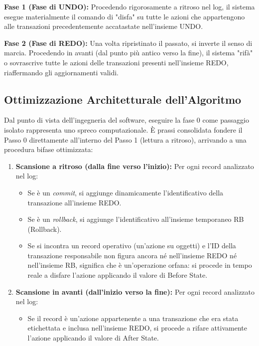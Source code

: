 \textbf{Fase 1 (Fase di UNDO):}
Procedendo rigorosamente a ritroso nel log, il sistema esegue materialmente il comando di "disfa" su tutte le azioni che appartengono alle transazioni precedentemente accatastate nell'insieme UNDO.

\textbf{Fase 2 (Fase di REDO):}
Una volta ripristinato il passato, si inverte il senso di marcia. Procedendo in avanti (dal punto più antico verso la fine), il sistema "rifà" o sovrascrive tutte le azioni delle transazioni presenti nell'insieme REDO, riaffermando gli aggiornamenti validi.

\subsection{Ottimizzazione Architetturale dell'Algoritmo}
Dal punto di vista dell'ingegneria del software, eseguire la fase 0 come passaggio isolato rappresenta uno spreco computazionale. È prassi consolidata fondere il Passo 0 direttamente all'interno del Passo 1 (lettura a ritroso), arrivando a una procedura bifase ottimizzata:

\begin{enumerate}
    \item \textbf{Scansione a ritroso (dalla fine verso l'inizio):} Per ogni record analizzato nel log:
    \begin{itemize}
        \item Se è un \textit{commit}, si aggiunge dinamicamente l'identificativo della transazione all'insieme REDO.
        \item Se è un \textit{rollback}, si aggiunge l'identificativo all'insieme temporaneo RB (Rollback).
        \item Se si incontra un record operativo (un'azione su oggetti) e l'ID della transazione responsabile non figura ancora né nell'insieme REDO né nell'insieme RB, significa che è un'operazione orfana: si procede in tempo reale a disfare l'azione applicando il valore di Before State.
    \end{itemize}
    \item \textbf{Scansione in avanti (dall'inizio verso la fine):} Per ogni record analizzato nel log:
    \begin{itemize}
        \item Se il record è un'azione appartenente a una transazione che era stata etichettata e inclusa nell'insieme REDO, si procede a rifare attivamente l'azione applicando il valore di After State.
    \end{itemize}
\end{enumerate}

